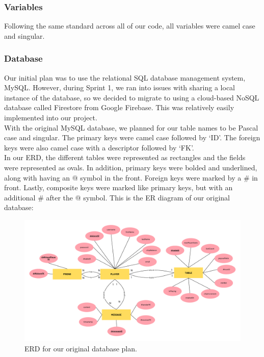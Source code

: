\subsubsection{Variables}
Following the same standard across all of our code, all variables were camel case and singular. 

\subsubsection{Database}
\label{sec:database}
\noindent Our initial plan was to use the relational SQL database management system, MySQL. However, during Sprint 1, we ran into issues with sharing a local instance of the database, so we decided to migrate to using a cloud-based NoSQL database called Firestore from Google Firebase. This was relatively easily implemented into our project.\\

\noindent With the original MySQL database, we planned for our table names to be Pascal case and singular. The primary keys were camel case followed by `ID'. The foreign keys were also camel case with a descriptor followed by `FK'.\\

\noindent In our ERD, the different tables were represented as rectangles and the fields were represented as ovals. In addition, primary keys were bolded and underlined, along with having an @ symbol in the front. Foreign keys were marked by a \# in front. Lastly, composite keys were marked like primary keys, but with an additional \# after the @ symbol. This is the ER diagram of our original database: 

\pagebreak

\begin{figure}[hbt!]
    \centering
    \includegraphics[width=1.0\linewidth]{figures/SE Database ERD.pdf}
    \caption{ERD for our original database plan.}
    \label{fig: original ERD}
\end{figure} 

